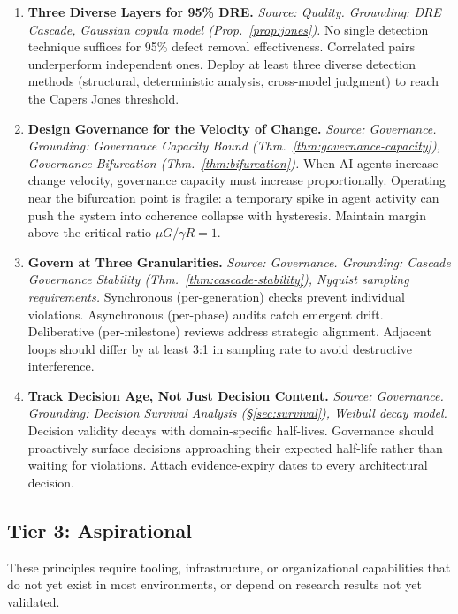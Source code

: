 \begin{enumerate}[label=\textbf{P\arabic*.}, leftmargin=3em, resume]
\item \textbf{Three Diverse Layers for 95\% DRE.}
\emph{Source: Quality. Grounding: DRE Cascade, Gaussian copula model (Prop.~\ref{prop:jones}).}
No single detection technique suffices for 95\% defect removal effectiveness. Correlated pairs underperform independent ones. Deploy at least three diverse detection methods (structural, deterministic analysis, cross-model judgment) to reach the Capers Jones threshold.

\item \textbf{Design Governance for the Velocity of Change.}
\emph{Source: Governance. Grounding: Governance Capacity Bound (Thm.~\ref{thm:governance-capacity}), Governance Bifurcation (Thm.~\ref{thm:bifurcation}).}
When AI agents increase change velocity, governance capacity must increase proportionally. Operating near the bifurcation point is fragile: a temporary spike in agent activity can push the system into coherence collapse with hysteresis. Maintain margin above the critical ratio $\mu G / \gamma R = 1$.

\item \textbf{Govern at Three Granularities.}
\emph{Source: Governance. Grounding: Cascade Governance Stability (Thm.~\ref{thm:cascade-stability}), Nyquist sampling requirements.}
Synchronous (per-generation) checks prevent individual violations. Asynchronous (per-phase) audits catch emergent drift. Deliberative (per-milestone) reviews address strategic alignment. Adjacent loops should differ by at least 3:1 in sampling rate to avoid destructive interference.

\item \textbf{Track Decision Age, Not Just Decision Content.}
\emph{Source: Governance. Grounding: Decision Survival Analysis (\S\ref{sec:survival}), Weibull decay model.}
Decision validity decays with domain-specific half-lives. Governance should proactively surface decisions approaching their expected half-life rather than waiting for violations. Attach evidence-expiry dates to every architectural decision.

\end{enumerate}

\subsection{Tier 3: Aspirational}
\label{sec:tier3}

These principles require tooling, infrastructure, or organizational capabilities that do not yet exist in most environments, or depend on research results not yet validated.

